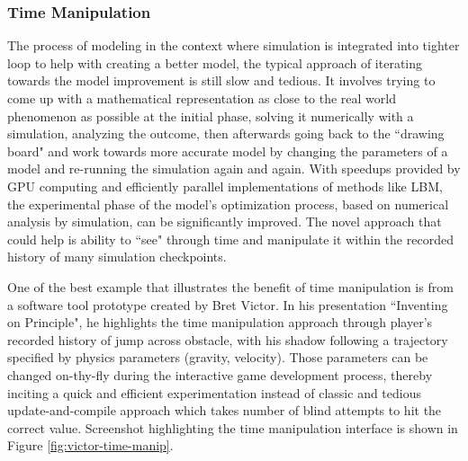 \subsubsection{Time Manipulation}
The process of modeling in the context where simulation is integrated into tighter loop to help with creating a better model, the typical approach of iterating towards the model improvement is still slow and tedious. It involves trying to come up with a mathematical representation as close to the real world phenomenon as possible at the initial phase, solving it numerically with a simulation, analyzing the outcome, then afterwards going back to the ``drawing board" and work towards more accurate model by changing the parameters of a model and re-running the simulation again and again. With speedups provided by GPU computing and efficiently parallel implementations of methods like LBM, the experimental phase of the model's optimization process, based on numerical analysis by simulation, can be significantly improved. The novel approach that could help is ability to ``see" through time and manipulate it within the recorded history of many simulation checkpoints.

One of the best example that illustrates the benefit of time manipulation is from a software tool prototype created by Bret Victor. In his presentation ``Inventing on Principle", he highlights the time manipulation approach through player's recorded history of jump across obstacle, with his shadow following a trajectory specified by physics parameters (gravity, velocity). Those parameters can be changed on-thy-fly during the interactive game development process, thereby inciting a quick and efficient experimentation instead of classic and tedious update-and-compile approach which takes number of blind attempts to hit the correct value. Screenshot highlighting the time manipulation interface is shown in Figure \ref{fig:victor-time-manip}.


